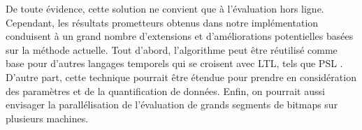 De toute évidence, cette solution ne convient que à l'évaluation hors ligne. Cependant, les résultats prometteurs obtenus dans notre implémentation conduisent à un grand nombre d'extensions et d'améliorations potentielles basées sur la méthode actuelle. Tout d'abord, l'algorithme peut être réutilisé comme base pour d'autres langages temporels qui se croisent avec LTL, tels que PSL \citep{IntroPSLBook}. D'autre part, cette technique pourrait être étendue pour prendre en considération des paramètres et de la quantification de données. Enfin, on pourrait aussi envisager la parallélisation de l'évaluation de grands segments de bitmaps sur plusieurs machines.

